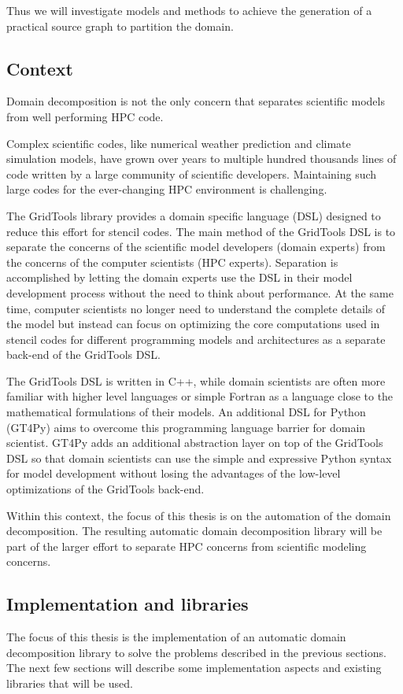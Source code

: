 Thus we will investigate models and methods to achieve the generation of a practical source graph to partition the domain.

\subsection{Context}
Domain decomposition is not the only concern that separates scientific models from well performing HPC code.

Complex scientific codes, like numerical weather prediction and climate simulation models, have grown over years to multiple hundred thousands lines of code written by a large community of scientific developers.
Maintaining such large codes for the ever-changing HPC environment is challenging.

The GridTools library provides a domain specific language (DSL) designed to reduce this effort for stencil codes.
The main method of the GridTools DSL is to separate the concerns of the scientific model developers (domain experts) from the concerns of the computer scientists (HPC experts).
Separation is accomplished by letting the domain experts use the DSL in their model development process without the need to think about performance.
At the same time, computer scientists no longer need to understand the complete details of the model but instead can focus on optimizing the core computations used in stencil codes for different programming models and architectures as a separate back-end of the GridTools DSL.

The GridTools DSL is written in C++, while domain scientists are often more familiar with higher level languages or simple Fortran as a language close to the mathematical formulations of their models.
An additional DSL for Python (GT4Py) aims to overcome this programming language barrier for domain scientist.
GT4Py adds an additional abstraction layer on top of the GridTools DSL so that domain scientists can use the simple and expressive Python syntax for model development without losing the advantages of the low-level optimizations of the GridTools back-end.

Within this context, the focus of this thesis is on the automation of the domain decomposition.
The resulting automatic domain decomposition library will be part of the larger effort to separate HPC concerns from scientific modeling concerns.

\subsection{Implementation and libraries}
The focus of this thesis is the implementation of an automatic domain decomposition library to solve the problems described in the previous sections.
The next few sections will describe some implementation aspects and existing libraries that will be used.

